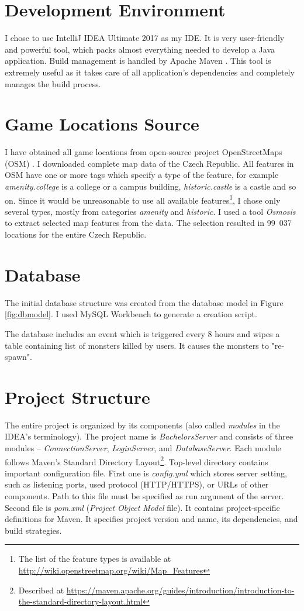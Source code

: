 \section{Development Environment}
I chose to use IntelliJ IDEA Ultimate 2017 \cite{idea} as my IDE. It is very user-friendly and powerful tool, which packs almost everything needed to develop a Java application. Build management is handled by Apache Maven \cite{maven}. This tool is extremely useful as it takes care of all application's dependencies and completely manages the build process. 

\section{Game Locations Source}
I have obtained all game locations from open-source project OpenStreetMaps (OSM) \cite{osm}. I downloaded complete map data of the Czech Republic. All features in OSM have one or more tags which specify a type of the feature, for example \textit{amenity.college} is a college or a campus building, \textit{historic.castle} is a castle and so on. Since it would be unreasonable to use all available features\footnote{The list of the feature types is available at \url{http://wiki.openstreetmap.org/wiki/Map_Features}}, I chose only several types, mostly from categories \textit{amenity} and \textit{historic}. I used a tool \textit{Osmosis} \cite{osmosis} to extract selected map features from the data. The selection resulted in 99~037 locations for the entire Czech Republic.

\section{Database}
The initial database structure was created from the database model in Figure \ref{fig:dbmodel}. I used MySQL Workbench \cite{mysqlworkbench} to generate a creation script.

The database includes an event which is triggered every 8 hours and wipes a table containing list of monsters killed by users. It causes the monsters to "re-spawn".  

\section{Project Structure}
The entire project is organized by its components (also called \textit{modules} in the IDEA's terminology). The project name is \textit{BachelorsServer} and consists of three modules -- \textit{ConnectionServer}, \textit{LoginServer}, and \textit{DatabaseServer}. Each module follows Maven's Standard Directory Layout\footnote{Described at \url{https://maven.apache.org/guides/introduction/introduction-to-the-standard-directory-layout.html}}. Top-level directory contains important configuration file. First one is \textit{config.yml} which stores server setting, such as listening ports, used protocol (HTTP/HTTPS), or URLs of other components. Path to this file must be specified as run argument of the server. Second file is \textit{pom.xml} (\textit{Project Object Model} file). It contains project-specific definitions for Maven. It specifies project version and name, its dependencies, and build strategies. 

